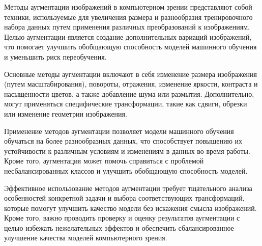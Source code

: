 
Методы аугментации изображений в компьютерном зрении представляют собой техники, используемые для увеличения размера и разнообразия тренировочного набора данных путем применения различных преобразований к изображениям. Целью аугментации является создание дополнительных вариаций изображений, что помогает улучшить обобщающую способность моделей машинного обучения и уменьшить риск переобучения.

Основные методы аугментации включают в себя изменение размера изображения (путем масштабирования), повороты, отражения, изменение яркости, контраста и насыщенности цветов, а также добавление шума или размытия. Дополнительно, могут применяться специфические трансформации, такие как сдвиги, обрезки или изменение геометрии изображения.

Применение методов аугментации позволяет модели машинного обучения обучаться на более разнообразных данных, что способствует повышению их устойчивости к различным условиям и изменениям в данных во время работы. Кроме того, аугментация может помочь справиться с проблемой несбалансированных классов и улучшить обобщающую способность моделей.

Эффективное использование методов аугментации требует тщательного анализа особенностей конкретной задачи и выбора соответствующих трансформаций, которые помогут улучшить качество модели без искажения смысла изображений. Кроме того, важно проводить проверку и оценку результатов аугментации с целью избежать нежелательных эффектов и обеспечить сбалансированное улучшение качества моделей компьютерного зрения.
